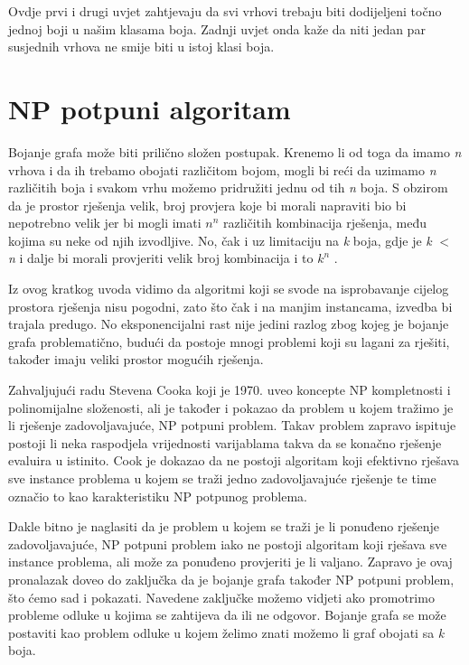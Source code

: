 \documentclass[times, utf8, zavrsni, numeric]{fer}
\begin{document}
Ovdje prvi i drugi uvjet zahtjevaju da svi vrhovi trebaju biti dodijeljeni točno jednoj boji u našim klasama boja. Zadnji uvjet onda kaže da niti jedan par susjednih vrhova ne smije biti u istoj klasi boja.

\newpage
\section{NP potpuni algoritam}
Bojanje grafa može biti prilično složen postupak. Krenemo li od toga da imamo \textit{n} vrhova i da ih trebamo obojati različitom bojom, mogli bi reći da uzimamo \textit{n} različitih boja i svakom vrhu možemo pridružiti jednu od tih \textit{n} boja. S obzirom da je prostor rješenja velik, broj provjera koje bi morali napraviti bio bi nepotrebno velik jer bi mogli imati $n^{n}$ različitih kombinacija rješenja, među kojima su neke od njih izvodljive. No, čak i uz limitaciju na \textit{k} boja, gdje je \textit{k} $<$  \textit{n} i dalje bi morali provjeriti velik broj kombinacija i to $k^{n}$ .\par
Iz ovog kratkog uvoda vidimo da algoritmi koji se svode na isprobavanje cijelog prostora rješenja nisu pogodni, zato što čak i na manjim instancama, izvedba bi trajala predugo. No eksponencijalni rast nije jedini razlog zbog kojeg je bojanje grafa problematično, budući da postoje  mnogi problemi koji su lagani za rješiti, također imaju veliki prostor mogućih rješenja. \par
Zahvaljujući radu Stevena Cooka koji je 1970. uveo koncepte NP kompletnosti i polinomijalne složenosti, ali je također i pokazao da  problem u kojem tražimo je li rješenje zadovoljavajuće, NP potpuni problem. Takav problem zapravo ispituje postoji li neka raspodjela vrijednosti varijablama takva da se konačno rješenje evaluira u istinito. Cook je dokazao da ne postoji algoritam koji efektivno rješava sve instance problema u kojem se traži jedno zadovoljavajuće rješenje te time označio to kao karakteristiku NP potpunog problema.\par
Dakle bitno je naglasiti da je problem u kojem se traži je li ponuđeno rješenje zadovoljavajuće, NP potpuni problem iako ne postoji algoritam koji rješava sve instance problema, ali može za ponuđeno provjeriti je li valjano. Zapravo je ovaj pronalazak doveo do zaključka da je bojanje grafa također NP potpuni problem, što ćemo sad i pokazati. Navedene zaključke možemo vidjeti ako promotrimo probleme odluke u kojima se zahtijeva da ili ne odgovor. Bojanje grafa se može postaviti kao problem odluke u kojem želimo znati možemo li graf obojati sa \textit{k} boja.\par
\end{document}
